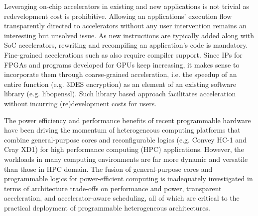 Leveraging on-chip accelerators in existing and new applications is
not trivial as redevelopment cost is prohibitive.  Allowing an
applications' execution flow transparently directed to accelerators
without any user intervention remains an interesting but unsolved
issue. As new instructions are typically added along with SoC
accelerators, rewriting and recompiling an application's code is
mandatory. Fine-grained accelerations such as
\cite{Govindaraju:2012fn} also require compiler support. Since IPs for
FPGAs and programs developed for GPUs keep increasing, it makes sense
to incorporate them through coarse-grained acceleration, i.e. the
speedup of an entire function (e.g. 3DES encryption) as an element of
an existing software library (e.g. libopenssl). Such library based
approach facilitates acceleration without incurring (re)development
costs for users.

The power efficiency \cite{hamada09,thomas09} and performance benefits
of recent programmable hardware have been driving the momentum of
heterogeneous computing platforms that combine general-purpose cores
and reconfigurable logics (e.g. Convey HC-1 \cite{brewer09} and Cray
XD1\cite{Ulmer:2005vh}) for high performance computing (HPC)
applications. However, the workloads in many computing environments
are far more dynamic and versatile than those in HPC domain. The
fusion of general-purpose cores and programmable logics for
power-efficient computing is inadequately investigated in terms of
architecture trade-offs on performance and power, transparent
acceleration, and accelerator-aware scheduling, all of which are
critical to the practical deployment of programmable heterogeneous
architectures.

